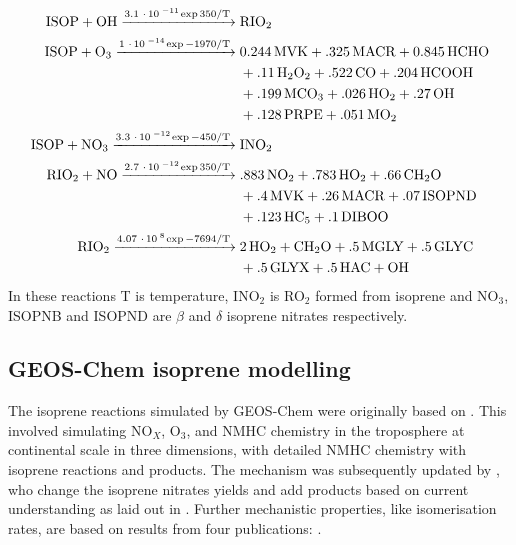     \begin{align} \begin{split}
    \label{Model:GC:Mechanisms:eqn_mechanisms}
    \ce{
      ISOP + OH ->[3.1*10^{-11} \exp{350/T}] & RIO2 \\ 
      ISOP + O3 ->[1*10^{-14} \exp{-1970/T}] & 0.244MVK + .325MACR + 0.845HCHO \\
      & + .11H2O2 + .522CO + .204HCOOH \\
      & + .199MCO3 +.026HO2 + .27OH \\
      & + .128PRPE + .051MO2 \\ 
      ISOP + NO3 ->[3.3*10^{-12} \exp{-450/T}] & INO2 \\
      RIO2 + NO ->[2.7*10^{-12} \exp{350/T}] & .883NO2 + .783HO2 + .66CH2O \\
      & + .4MVK + .26MACR + .07ISOPND \\
      & + .123HC5 + .1DIBOO \\
      RIO2 ->[4.07*10^{8} \exp{-7694/T}] & 2HO2 + CH2O + .5MGLY + .5GLYC \\
      & + .5GLYX + .5HAC + OH
    }
    \end{split} \end{align}
    In these reactions T is temperature, INO$_2$ is RO$_2$ formed from isoprene and NO$_3$, ISOPNB and ISOPND are $\beta$ and $\delta$ isoprene nitrates respectively.
  
  \subsection{GEOS-Chem isoprene modelling}
    \label{Model:GC:Isop}
    
    The isoprene reactions simulated by GEOS-Chem were originally based on \textcite{Horowitz1998}.
    This involved simulating NO$_X$, O$_3$, and NMHC chemistry in the troposphere at continental scale in three dimensions, with detailed NMHC chemistry with isoprene reactions and products.
    The mechanism was subsequently updated by \textcite{Mao2013}, who change the isoprene nitrates yields and add products based on current understanding as laid out in \textcite{Paulot2009a, Paulot2009b}.
    Further mechanistic properties, like isomerisation rates, are based on results from four publications: \parencite{Peeters2009, Peeters2010, Crounse2011, Crounse2012}.
    
